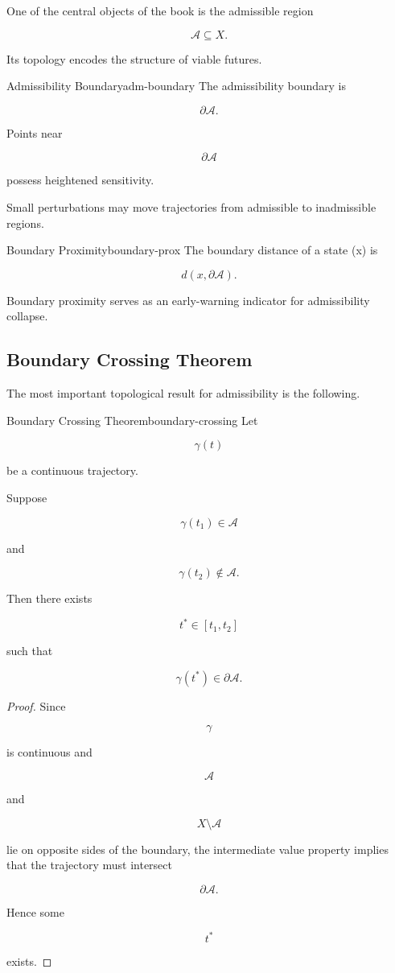 \documentclass[12pt,twoside,openright]{book}
\begin{document}
One of the central objects of the book is the admissible
region

\[
\mathcal A
\subseteq X.
\]

Its topology encodes the structure of viable futures.

\begin{definition}{Admissibility Boundary}{adm-boundary}
The admissibility boundary is

\[
\partial\mathcal A.
\]
\end{definition}

Points near

\[
\partial\mathcal A
\]

possess heightened sensitivity.

Small perturbations may move trajectories from admissible
to inadmissible regions.

\begin{definition}{Boundary Proximity}{boundary-prox}
The boundary distance of a state (x) is

\[
d(x,\partial\mathcal A).
\]
\end{definition}

Boundary proximity serves as an early-warning indicator
for admissibility collapse.

\subsection{Boundary Crossing Theorem}

The most important topological result for admissibility is
the following.

\begin{theorem}{Boundary Crossing Theorem}{boundary-crossing}
Let

\[
\gamma(t)
\]

be a continuous trajectory.

Suppose

\[
\gamma(t_1)
\in
\mathcal A
\]

and

\[
\gamma(t_2)
\notin
\mathcal A.
\]

Then there exists

\[
t^*
\in[t_1,t_2]
\]

such that

\[
\gamma(t^*)
\in
\partial\mathcal A.
\]
\end{theorem}

\begin{proof}
Since

\[
\gamma
\]

is continuous and

\[
\mathcal A
\]

and

\[
X\setminus\mathcal A
\]

lie on opposite sides of the boundary, the intermediate
value property implies that the trajectory must intersect

\[
\partial\mathcal A.
\]

Hence some

\[
t^*
\]

exists.
\end{proof}
\end{document}
